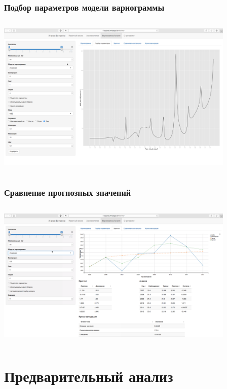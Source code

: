 \documentclass[10pt, ucs, pdf,aspectratio=169]{beamer}
\begin{document}
\begin{frame}
  \frametitle{Подбор параметров модели вариограммы}   %
   \begin{columns}[c]
   \column{4.5in}
  \includegraphics[width=4.5in]{../../figures/static/5_fit.png}
  \end{columns}
\end{frame}

\begin{frame}
  \frametitle{Сравнение прогнозных значений}   %
   \begin{columns}[c]
   \column{4.5in}
  \includegraphics[width=4.5in]{../../figures/static/6_krige.png}
  \end{columns}
\end{frame}

\section{Предварительный анализ}
\end{document}
